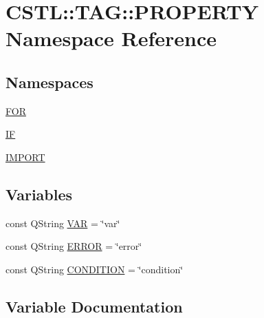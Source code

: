 \hypertarget{namespace_c_s_t_l_1_1_t_a_g_1_1_p_r_o_p_e_r_t_y}{}\section{C\+S\+TL\+:\+:T\+AG\+:\+:P\+R\+O\+P\+E\+R\+TY Namespace Reference}
\label{namespace_c_s_t_l_1_1_t_a_g_1_1_p_r_o_p_e_r_t_y}
\subsection*{Namespaces}
\begin{DoxyCompactItemize}
\item 
 \hyperlink{namespace_c_s_t_l_1_1_t_a_g_1_1_p_r_o_p_e_r_t_y_1_1_f_o_r}{F\+OR}
\item 
 \hyperlink{namespace_c_s_t_l_1_1_t_a_g_1_1_p_r_o_p_e_r_t_y_1_1_i_f}{IF}
\item 
 \hyperlink{namespace_c_s_t_l_1_1_t_a_g_1_1_p_r_o_p_e_r_t_y_1_1_i_m_p_o_r_t}{I\+M\+P\+O\+RT}
\end{DoxyCompactItemize}
\subsection*{Variables}
\begin{DoxyCompactItemize}
\item 
const Q\+String \hyperlink{namespace_c_s_t_l_1_1_t_a_g_1_1_p_r_o_p_e_r_t_y_a19cc186d6c9044fa89a0c3f17d7bdf1b}{V\+AR} = \char`\"{}var\char`\"{}
\item 
const Q\+String \hyperlink{namespace_c_s_t_l_1_1_t_a_g_1_1_p_r_o_p_e_r_t_y_ac3c4e7db1338abd40aecbcbff17c9cbc}{E\+R\+R\+OR} = \char`\"{}error\char`\"{}
\item 
const Q\+String \hyperlink{namespace_c_s_t_l_1_1_t_a_g_1_1_p_r_o_p_e_r_t_y_ab902a5752666d702e0e7c87551b194f8}{C\+O\+N\+D\+I\+T\+I\+ON} = \char`\"{}condition\char`\"{}
\end{DoxyCompactItemize}


\subsection{Variable Documentation}
\mbox{\label{namespace_c_s_t_l_1_1_t_a_g_1_1_p_r_o_p_e_r_t_y_ab902a5752666d702e0e7c87551b194f8}} 
